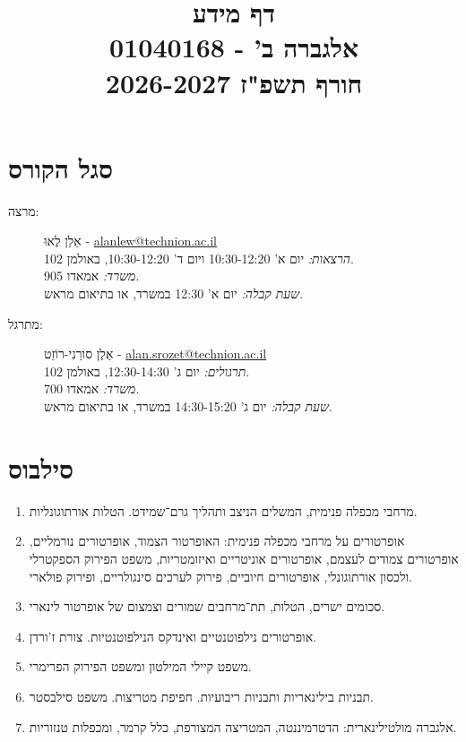 \documentclass{article}
\title{דף מידע \\ אלגברה ב' - 01040168 \\ חורף תשפ"ז 2026-2027}
\date{}
\begin{document}
\maketitle

\section*{סגל הקורס}

\begin{description}
\item[מרצה:]
אַלַן לֶאוּ
-
\textenglish{\href{mailto:alanlew@technion.ac.il}{alanlew@technion.ac.il}}
\\
\emph{הרצאות:}
יום א' 10:30-12:20 ויום ד' 10:30-12:20, באולמן 102.
\\
\emph{משרד:}
אמאדו 905.
\\
\emph{שעת קבלה:}
יום א' 12:30 במשרד, או בתיאום מראש.

\item[מתרגל:] 
אַלֶן סוֹרַנִי-רוֹזֵט
-
\textenglish{\href{mailto:alan.srozet@technion.ac.il}{alan.srozet@technion.ac.il}}
\\
\emph{תרגולים:}
יום ג' 12:30-14:30, באולמן 102.
\\
\emph{משרד:}
אמאדו 700.
\\
\emph{שעת קבלה:}
יום ג' 14:30-15:20 במשרד, או בתיאום מראש.

\end{description}

\section*{סילבוס}
\begin{enumerate}
\item מרחבי מכפלה פנימית, המשלים הניצב ותהליך גרם־שמידט. הטלות אורתוגונליות.
\item
אופרטורים על מרחבי מכפלה פנימית:
 האופרטור הצמוד, אופרטורים נורמליים, אופרטורים צמודים לעצמם, אופרטורים אוניטריים ואיזומטריות,
משפט הפירוק הספקטרלי ולכסון אורתוגונלי, אופרטורים חיוביים, פירוק לערכים סינגולריים, ופירוק פולארי.
\item סכומים ישרים, הטלות, תת־מרחבים שמורים וצמצום של אופרטור לינארי.
\item אופרטורים נילפוטנטיים ואינדקס הנילפוטנטיות. צורת ז'ורדן.
\item משפט קיילי המילטון ומשפט הפירוק הפרימרי.
\item תבניות בילינאריות ותבניות ריבועיות. חפיפת מטריצות. משפט סילבסטר.
\item אלגברה מולטילינארית: הדטרמיננטה, המטריצה המצורפת, כלל קרמר, ומכפלות טנזוריות.
\end{enumerate}
\end{document}
